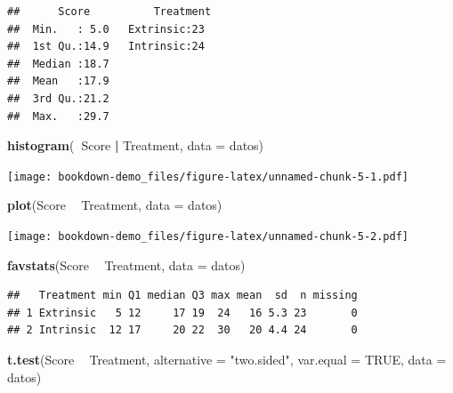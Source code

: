 \documentclass[]{book}
\newenvironment{Shaded}{\begin{snugshade}}{\end{snugshade}}
\newcommand{\KeywordTok}[1]{\textcolor[rgb]{0.13,0.29,0.53}{\textbf{#1}}}
\newcommand{\DataTypeTok}[1]{\textcolor[rgb]{0.13,0.29,0.53}{#1}}
\newcommand{\StringTok}[1]{\textcolor[rgb]{0.31,0.60,0.02}{#1}}
\newcommand{\OtherTok}[1]{\textcolor[rgb]{0.56,0.35,0.01}{#1}}
\newcommand{\OperatorTok}[1]{\textcolor[rgb]{0.81,0.36,0.00}{\textbf{#1}}}
\newcommand{\NormalTok}[1]{#1}
\begin{document}
\begin{verbatim}
##      Score          Treatment 
##  Min.   : 5.0   Extrinsic:23  
##  1st Qu.:14.9   Intrinsic:24  
##  Median :18.7                 
##  Mean   :17.9                 
##  3rd Qu.:21.2                 
##  Max.   :29.7
\end{verbatim}

\begin{Shaded}
\begin{Highlighting}[]
\KeywordTok{histogram}\NormalTok{(}\OperatorTok{~}\NormalTok{Score }\OperatorTok{|}\StringTok{ }\NormalTok{Treatment, }\DataTypeTok{data =}\NormalTok{ datos)}
\end{Highlighting}
\end{Shaded}

\texttt{[image: bookdown-demo\_files/figure-latex/unnamed-chunk-5-1.pdf]}

\begin{Shaded}
\begin{Highlighting}[]
\KeywordTok{plot}\NormalTok{(Score }\OperatorTok{~}\StringTok{ }\NormalTok{Treatment, }\DataTypeTok{data =}\NormalTok{ datos)}
\end{Highlighting}
\end{Shaded}

\texttt{[image: bookdown-demo\_files/figure-latex/unnamed-chunk-5-2.pdf]}

\begin{Shaded}
\begin{Highlighting}[]
\KeywordTok{favstats}\NormalTok{(Score }\OperatorTok{~}\StringTok{ }\NormalTok{Treatment, }\DataTypeTok{data =}\NormalTok{ datos)}
\end{Highlighting}
\end{Shaded}

\begin{verbatim}
##   Treatment min Q1 median Q3 max mean  sd  n missing
## 1 Extrinsic   5 12     17 19  24   16 5.3 23       0
## 2 Intrinsic  12 17     20 22  30   20 4.4 24       0
\end{verbatim}

\begin{Shaded}
\begin{Highlighting}[]
\KeywordTok{t.test}\NormalTok{(Score }\OperatorTok{~}\StringTok{ }\NormalTok{Treatment, }\DataTypeTok{alternative =} \StringTok{"two.sided"}\NormalTok{, }\DataTypeTok{var.equal =} \OtherTok{TRUE}\NormalTok{, }\DataTypeTok{data =}\NormalTok{ datos)}
\end{Highlighting}
\end{Shaded}
\end{document}
